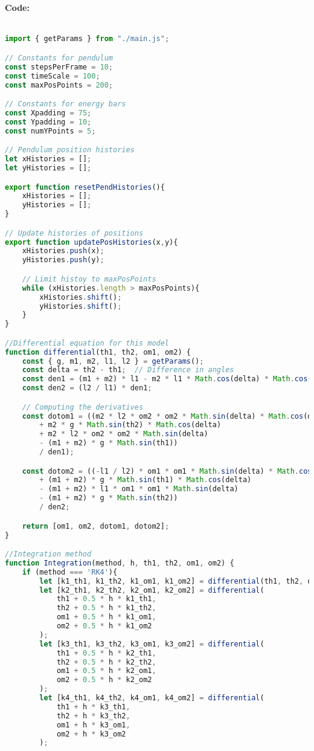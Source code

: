 \documentclass[12pt]{article}
\begin{document}
\paragraph{Code:}
\begin{lstlisting}[language=JavaScript]

import { getParams } from "./main.js";

// Constants for pendulum
const stepsPerFrame = 10;
const timeScale = 100;
const maxPosPoints = 200;

// Constants for energy bars
const Xpadding = 75;
const Ypadding = 10;
const numYPoints = 5;

// Pendulum position histories
let xHistories = [];
let yHistories = [];

export function resetPendHistories(){
    xHistories = [];
    yHistories = [];
}

// Update histories of positions
export function updatePosHistories(x,y){
    xHistories.push(x);
    yHistories.push(y);

    // Limit histoy to maxPosPoints
    while (xHistories.length > maxPosPoints){
        xHistories.shift();
        yHistories.shift();
    }
}

//Differential equation for this model
function differential(th1, th2, om1, om2) {
    const { g, m1, m2, l1, l2 } = getParams();
    const delta = th2 - th1;  // Difference in angles
    const den1 = (m1 + m2) * l1 - m2 * l1 * Math.cos(delta) * Math.cos(delta);
    const den2 = (l2 / l1) * den1;

    // Computing the derivatives
    const dotom1 = ((m2 * l2 * om2 * om2 * Math.sin(delta) * Math.cos(delta)
        + m2 * g * Math.sin(th2) * Math.cos(delta)
        + m2 * l2 * om2 * om2 * Math.sin(delta)
        - (m1 + m2) * g * Math.sin(th1))
        / den1);

    const dotom2 = ((-l1 / l2) * om1 * om1 * Math.sin(delta) * Math.cos(delta)
        + (m1 + m2) * g * Math.sin(th1) * Math.cos(delta)
        - (m1 + m2) * l1 * om1 * om1 * Math.sin(delta)
        - (m1 + m2) * g * Math.sin(th2))
        / den2;

    return [om1, om2, dotom1, dotom2];
}

//Integration method
function Integration(method, h, th1, th2, om1, om2) {
    if (method === 'RK4'){
        let [k1_th1, k1_th2, k1_om1, k1_om2] = differential(th1, th2, om1, om2);
        let [k2_th1, k2_th2, k2_om1, k2_om2] = differential(
            th1 + 0.5 * h * k1_th1,
            th2 + 0.5 * h * k1_th2,
            om1 + 0.5 * h * k1_om1,
            om2 + 0.5 * h * k1_om2
        );
        let [k3_th1, k3_th2, k3_om1, k3_om2] = differential(
            th1 + 0.5 * h * k2_th1,
            th2 + 0.5 * h * k2_th2,
            om1 + 0.5 * h * k2_om1,
            om2 + 0.5 * h * k2_om2
        );
        let [k4_th1, k4_th2, k4_om1, k4_om2] = differential(
            th1 + h * k3_th1,
            th2 + h * k3_th2,
            om1 + h * k3_om1,
            om2 + h * k3_om2
        );


\end{lstlisting}
\end{document}
